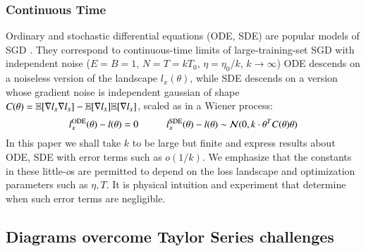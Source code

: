             \subsubsection{Continuous Time}
                Ordinary and stochastic differential equations (ODE, SDE) are
                popular models of SGD \citep{li18, ba21}.  They correspond to
                continuous-time limits of large-training-set SGD with
                independent noise ($E=B=1$, $N=T=kT_0$, $\eta=\eta_0/k$, $k\to
                \infty$) ODE descends on a noiseless version of the landscape
                $l_x(\theta)$, while SDE descends on a version whose gradient
                noise is independent gaussian of shape $C(\theta) =
                \mathbb{E}[\nabla l_x \nabla l_x] - \mathbb{E}[\nabla l_x] \mathbb{E}[\nabla
                l_x]$, scaled as in a Wiener process:
                $$
                    l^{\text{ODE}}_x(\theta) - l(\theta) = 0
                    \hspace{1cm}
                    l^{\text{SDE}}_x(\theta) - l(\theta)
                        \sim \mathcal{N}(0, k\cdot \theta^T C(\theta)\theta)
                $$
                In this paper we shall take $k$ to be large but finite and
                express results about ODE, SDE with error terms such as
                $o(1/k)$.  We emphasize that the constants in these little-$o$s
                are permitted to depend on the loss landscape and optimization
                parameters such as $\eta, T$.  It is physical intuition and
                experiment that determine when such error terms are negligible.

        \subsection{Diagrams overcome Taylor Series challenges}\label{sect:using}\label{sect:diagrams}

